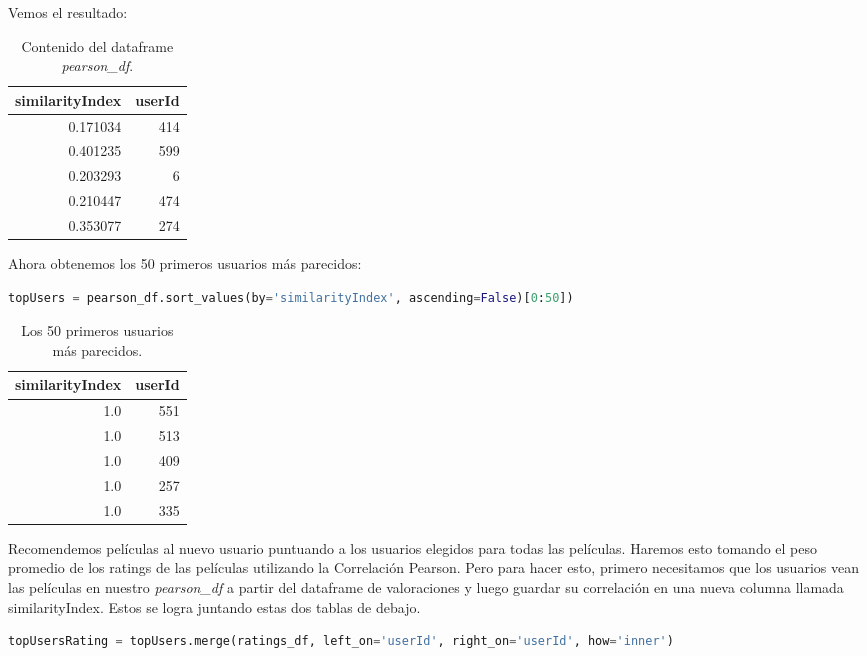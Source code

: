 \documentclass{uimppracticas}
\begin{document}
Vemos el resultado:

\begin{table}[h]
	\centering
	\begin{tabular}{rr}
		\toprule
		similarityIndex &  userId \\
		\midrule
		0.171034 &     414 \\
		0.401235 &     599 \\
		0.203293 &       6 \\
		0.210447 &     474 \\
		0.353077 &     274 \\
		\bottomrule
	\end{tabular}
	\caption{Contenido del dataframe \textit{pearson\_df}.}
	\label{pearson}
\end{table}

Ahora obtenemos los 50 primeros usuarios más parecidos:

\begin{lstlisting}[language=python, basicstyle=\small]
topUsers = pearson_df.sort_values(by='similarityIndex', ascending=False)[0:50])
\end{lstlisting}

\begin{table}[h]
	\centering
	\begin{tabular}{rr}
		\toprule
		similarityIndex &  userId \\
		\midrule
		1.0 &     551 \\
		1.0 &     513 \\
		1.0 &     409 \\
		1.0 &     257 \\
		1.0 &     335 \\
		\bottomrule
	\end{tabular}
	\caption{Los 50 primeros usuarios más parecidos.}
	\label{usuarios_parecidos}
\end{table}

Recomendemos películas al nuevo usuario puntuando a los usuarios elegidos para todas las películas. Haremos esto tomando el peso promedio de los ratings de las películas utilizando la Correlación Pearson. Pero para hacer esto, primero necesitamos que los usuarios vean las películas en nuestro \textit{pearson\_df} a partir del dataframe de valoraciones y luego guardar su correlación en una nueva columna llamada similarityIndex. Estos se logra juntando estas dos tablas de debajo.

\begin{lstlisting}[language=python, basicstyle=\small]
topUsersRating = topUsers.merge(ratings_df, left_on='userId', right_on='userId', how='inner')
\end{lstlisting}
\end{document}
